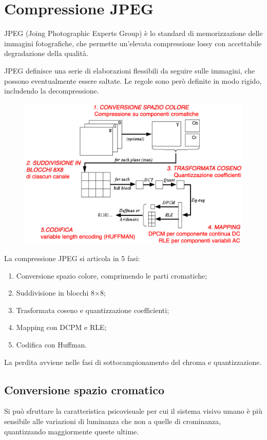 \section{Compressione JPEG}
JPEG (Joing Photographic Experts Group) è lo standard di memorizzazione delle immagini fotografiche, che permette un'elevata compressione lossy con accettabile degradazione della qualità. 

JPEG definisce una serie di elaborazioni flessibili da seguire sulle immagini, che possono eventualmente essere saltate. Le regole sono però definite in modo rigido, includendo la decompressione.

\begin{figure}[h]
	\centering
	\includegraphics[scale=0.46]{Lezioni/Immagini/jpeg}
\end{figure}

La compressione JPEG si articola in 5 fasi:
\begin{enumerate}
	\item Conversione spazio colore, comprimendo le parti cromatiche;
	\item Suddivisione in blocchi 8$\times$8;
	\item Trasformata coseno e quantizzazione coefficienti;
	\item Mapping con DCPM e RLE;
	\item Codifica con Huffman.
\end{enumerate}
La perdita avviene nelle fasi di sottocampionamento del chroma e quantizzazione. 

\subsection{Conversione spazio cromatico}
Si può sfruttare la caratteristica psicovisuale per cui il sistema visivo umano è più sensibile alle variazioni di luminanza che non a quelle di crominanza, quantizzando maggiormente queste ultime.

